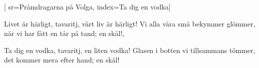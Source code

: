 [ 							
	sr={Pråmdragarna på Volga},
	index={Ta dig en vodka}]		
	
\beginverse*						
Livet är härligt,
tavaritj, vårt liv är härligt!
Vi alla våra små bekymmer glömmer, 
när vi har fått en tår på tand; en skål!,
\endverse						

\beginverse				
Ta dig en vodka, 
tavaritj, en liten vodka! 
Glasen i botten vi tillsammans tömmer,
det kommer mera efter hand; en skål!
\endverse

\endsong		
